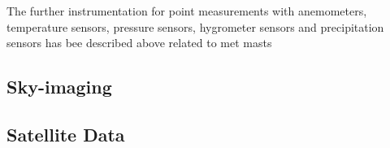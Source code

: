 The further instrumentation for point measurements with anemometers, temperature sensors, pressure sensors, hygrometer sensors and precipitation sensors has bee described above related to met masts

 
\subsection{Sky-imaging}

\subsection{Satellite Data}




%
%
%
%



